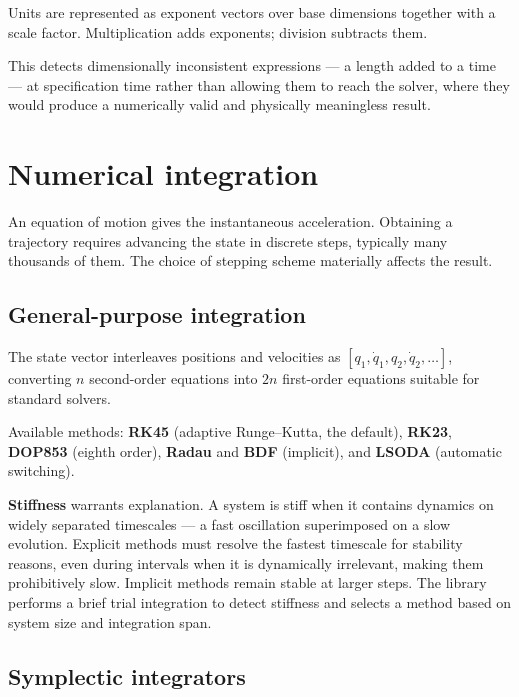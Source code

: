 \documentclass[11pt,a4paper]{article}
\begin{document}
Units are represented as exponent vectors over base dimensions together with a scale factor.
Multiplication adds exponents; division subtracts them.

This detects dimensionally inconsistent expressions --- a length added to a time --- at specification
time rather than allowing them to reach the solver, where they would produce a numerically valid and
physically meaningless result.

\section{Numerical integration}
\label{sec:numerics}

An equation of motion gives the instantaneous acceleration. Obtaining a trajectory requires advancing
the state in discrete steps, typically many thousands of them. The choice of stepping scheme
materially affects the result.

\subsection{General-purpose integration}

The state vector interleaves positions and velocities as
$[q_1, \dot q_1, q_2, \dot q_2, \dots]$, converting $n$ second-order equations into $2n$ first-order
equations suitable for standard solvers.

Available methods: \textbf{RK45} (adaptive Runge--Kutta, the default), \textbf{RK23},
\textbf{DOP853} (eighth order), \textbf{Radau} and \textbf{BDF} (implicit), and \textbf{LSODA}
(automatic switching).

\textbf{Stiffness} warrants explanation. A system is stiff when it contains dynamics on widely
separated timescales --- a fast oscillation superimposed on a slow evolution. Explicit methods must
resolve the fastest timescale for stability reasons, even during intervals when it is dynamically
irrelevant, making them prohibitively slow. Implicit methods remain stable at larger steps. The
library performs a brief trial integration to detect stiffness and selects a method based on system
size and integration span.

\subsection{Symplectic integrators}
\label{sec:symplectic}
\end{document}

